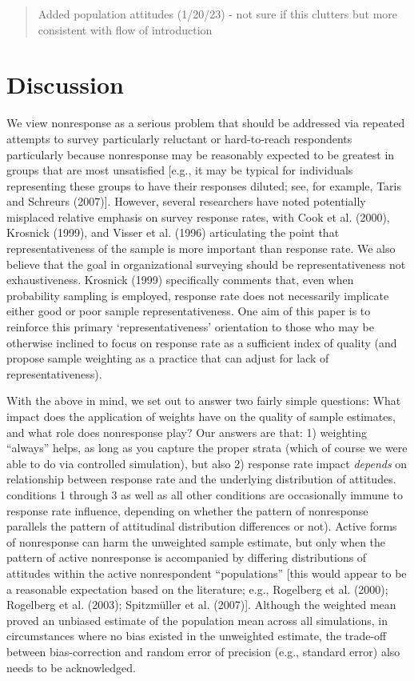 \documentclass[
  man,mask]{apa7}
\begin{document}
\begin{quote}
Added population attitudes (1/20/23) - not sure if this clutters but more consistent with flow of introduction
\end{quote}

\hypertarget{discussion}{%
\section{Discussion}\label{discussion}}

We view nonresponse as a serious problem that should be addressed via repeated attempts to survey particularly reluctant or hard-to-reach respondents particularly because nonresponse may be reasonably expected to be greatest in groups that are most unsatisfied {[}e.g., it may be typical for individuals representing these groups to have their responses diluted; see, for example, Taris and Schreurs (2007){]}. However, several researchers have noted potentially misplaced relative emphasis on survey response rates, with Cook et al. (2000), Krosnick (1999), and Visser et al. (1996) articulating the point that representativeness of the sample is more important than response rate. We also believe that the goal in organizational surveying should be representativeness not exhaustiveness. Krosnick (1999) specifically comments that, even when probability sampling is employed, response rate does not necessarily implicate either good or poor sample representativeness. One aim of this paper is to reinforce this primary `representativeness' orientation to those who may be otherwise inclined to focus on response rate as a sufficient index of quality (and propose sample weighting as a practice that can adjust for lack of representativeness).

With the above in mind, we set out to answer two fairly simple questions: What impact does the application of weights have on the quality of sample estimates, and what role does nonresponse play? Our answers are that: 1) weighting ``always'' helps, as long as you capture the proper strata (which of course we were able to do via controlled simulation), but also 2) response rate impact \emph{depends} on relationship between response rate and the underlying distribution of attitudes. conditions 1 through 3 as well as all other conditions are occasionally immune to response rate influence, depending on whether the pattern of nonresponse parallels the pattern of attitudinal distribution differences or not). Active forms of nonresponse can harm the unweighted sample estimate, but only when the pattern of active nonresponse is accompanied by differing distributions of attitudes within the active nonrespondent ``populations'' {[}this would appear to be a reasonable expectation based on the literature; e.g., Rogelberg et al. (2000); Rogelberg et al. (2003); Spitzmüller et al. (2007){]}. Although the weighted mean proved an unbiased estimate of the population mean across all simulations, in circumstances where no bias existed in the unweighted estimate, the trade-off between bias-correction and random error of precision (e.g., standard error) also needs to be acknowledged.
\end{document}
